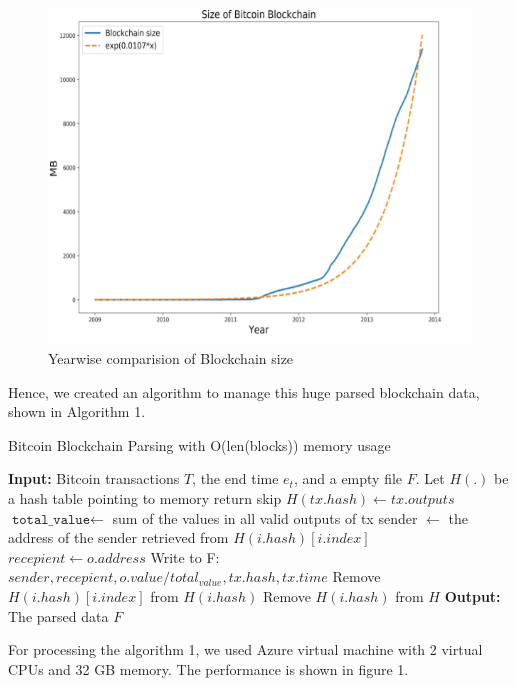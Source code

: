 \documentclass[runningheads,a4paper]{llncs}[2017/09/04]
\begin{document}
\begin{figure}[!htb]
	\centering 
	\includegraphics[width=0.8\columnwidth]{2} 
	\caption{Yearwise comparision of Blockchain size} %
	\label{second}
\end{figure}

Hence, we created an algorithm to manage this huge parsed blockchain data, shown in Algorithm 1.

\begin{algorithm}[!h]
	\caption{Bitcoin Blockchain Parsing with O(len(blocks)) memory usage}
	\begin{algorithmic}
		\State \textbf{Input: } Bitcoin transactions $T$, the end time $e_t$, and a empty file $F$.
		\State Let $H(.)$ be a hash table pointing to memory
		\State return
		\EndIf
		\State skip
		\EndIf
		\State $H(tx.hash) \gets tx.outputs$
		\State $\texttt{total_value} \gets$ sum of the values in all valid outputs of tx
		\State sender $\gets$ the address of the sender retrieved from $H(i.hash)[i.index]$
		\State $recepient \gets o.address$
		\State Write to F: $sender, recepient, o.value / total_{value}, tx.hash, tx.time$
		\State Remove $H(i.hash)[i.index]$ from $H(i.hash)$
		\State Remove $H(i.hash)$ from $H$
		\EndIf
		\EndFor
		\EndFor
		\EndFor
		\State \textbf{Output: } The parsed data $F$
	\end{algorithmic}
\end{algorithm}

For processing the algorithm 1, we used Azure virtual machine with 2 virtual CPUs and 32 GB memory.
The performance is shown in figure 1.
\end{document}
